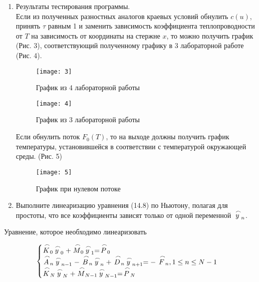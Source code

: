 \documentclass[a4paper, 14pt]{article}
\begin{document}
\begin{enumerate}
\item Результаты тестирования программы.\\
Если из полученных разностных аналогов краевых условий обнулить $c(u)$, принять $\tau$ равным 1 и заменить зависимость коэффициента теплопроводности от $T$ на зависимость от координаты на стержне $x$, то можно получить график (Рис. 3), соответствующий полученному графику в 3 лабораторной работе (Рис. 4).
\begin{figure}[H]
        	\begin{center}
        		\texttt{[image: 3]}
        		\caption{График из 4 лабораторной работы}
        		\label{fig:res1}
        	\end{center}
\end{figure}

\begin{figure}[H]
        	\begin{center}
        		\texttt{[image: 4]}
        		\caption{График из 3 лабораторной работы}
        		\label{fig:res1}
        	\end{center}
\end{figure}

\newpage
Если обнулить поток $F_0 (T)$, то на выходе должны получить график температуры, установившейся в соответствии с температурой окружающей среды. (Рис. 5)

\begin{figure}[H]
        	\begin{center}
        		\texttt{[image: 5]}
        		\caption{График при нулевом потоке}
        		\label{fig:res1}
        	\end{center}
\end{figure}

\item Выполните линеаризацию уравнения (14.8) по Ньютону, полагая для простоты, что все коэффициенты зависят только от одной переменной $\buildrel\,\,\frown\over{y}_n$.
\end{enumerate}

Уравнение, которое необходимо линеаризовать

\begin{equation}
\begin{cases}
\buildrel\,\,\frown\over{K}_0\buildrel\,\,\frown\over{y}_0+\buildrel\,\,\frown\over{M}_0\buildrel\,\,\frown\over{y}_1=\buildrel\,\,\frown\over{P}_0\\
\buildrel\,\,\frown\over{A}_n\buildrel\,\,\frown\over{y}_{n-1}-\buildrel\,\,\frown\over{B}_n\buildrel\,\,\frown\over{y}_n+\buildrel\,\,\frown\over{D}_n\buildrel\,\,\frown\over{y}_{n+1}=-\buildrel\,\,\frown\over{F}_n, 1\le n\le N-1\\
\buildrel\,\,\frown\over{K}_N\buildrel\,\,\frown\over{y}_N+\buildrel\,\,\frown\over{M}_{N-1}\buildrel\,\,\frown\over{y}_{N-1}=\buildrel\,\,\frown\over{P}_N\\
\end{cases}
\end{equation}
\end{document}
